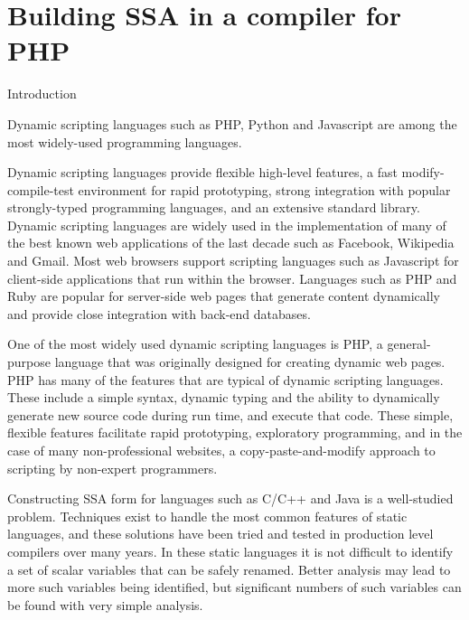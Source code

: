 \chapter{Building SSA in a compiler for PHP\\ }

\providecommand{\phc}{PHC}
\providecommand{\php}[1]{\textit{#1}}
\providecommand{\pbterm}[1]{\textsf{#1}}
\providecommand{\chref}[1]{Chapter~#1}
\providecommand{\secref}[1]{Chapter~#1}
\providecommand{\figref}[1]{Figure~#1}
\providecommand{\comnt}[1]

\section{Introduction}

Dynamic scripting languages such as PHP, Python and Javascript are
among the most widely-used programming languages.

Dynamic scripting languages provide flexible high-level features, a
fast modify-compile-test environment for rapid prototyping, strong
integration with popular strongly-typed programming languages, and an
extensive standard library.  Dynamic scripting languages are widely
used in the implementation of many of the best known web applications
of the last decade such as Facebook, Wikipedia and Gmail. Most web
browsers support scripting languages such as Javascript for
client-side applications that run within the browser. Languages such
as PHP and Ruby are popular for server-side web pages that generate
content dynamically and provide close integration with back-end
databases.

One of the most widely used dynamic scripting languages is PHP, a
general-purpose language that was originally designed for creating
dynamic web pages.  PHP has many of the features that are typical of
dynamic scripting languages.  These include a simple syntax, dynamic
typing and the ability to dynamically generate new source code during
run time, and execute that code. These simple, flexible features
facilitate rapid prototyping, exploratory programming, and in the case
of many non-professional websites, a copy-paste-and-modify approach to
scripting by non-expert programmers.

Constructing SSA form for languages such as C/C++ and Java is a
well-studied problem. Techniques exist to handle the most common
features of static languages, and these solutions have been tried and
tested in production level compilers over many years.  In these static
languages it is not difficult to identify a set of scalar variables
that can be safely renamed.  Better analysis may lead to more such
variables being identified, but significant numbers of such variables
can be found with very simple analysis.


